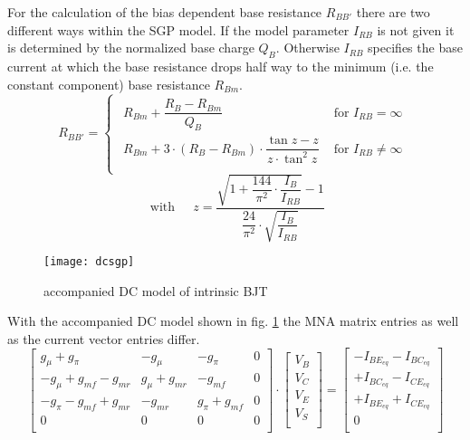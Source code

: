 For the calculation of the bias dependent base resistance $R_{BB'}$
there are two different ways within the SGP model.  If the model
parameter $I_{RB}$ is not given it is determined by the normalized
base charge $Q_B$.  Otherwise $I_{RB}$ specifies the base current at
which the base resistance drops half way to the minimum (i.e. the
constant component) base resistance $R_{Bm}$.
\begin{equation}
R_{BB'} =
\begin{cases}
\begin{array}{ll}
R_{Bm} + \dfrac{R_B - R_{Bm}}{Q_B} & \text{ for } I_{RB} = \infty\\
R_{Bm} + 3\cdot \left(R_B - R_{Bm}\right)\cdot \dfrac{\tan{z} - z}{z\cdot \tan^2{z}} & \text{ for } I_{RB} \neq \infty\\
\end{array}
\end{cases}
\end{equation}
\begin{equation}
\text{ with } \;\;\;\;
z = \frac{\sqrt{1 + \dfrac{144}{\pi^2}\cdot\dfrac{I_B}{I_{RB}}} -1}{\dfrac{24}{\pi^2}\cdot\sqrt{\dfrac{I_B}{I_{RB}}}}
\end{equation}

\begin{figure}[ht]
\begin{center}
\texttt{[image: dcsgp]}
\end{center}
\caption{accompanied DC model of intrinsic BJT}
\label{fig:dcsgp}
\end{figure}
\FloatBarrier

With the accompanied DC model shown in fig. \ref{fig:dcsgp} the MNA
matrix entries as well as the current vector entries differ.
\begin{equation}
\begin{bmatrix}
g_{\mu} + g_{\pi} & -g_{\mu} & -g_{\pi} & 0\\
-g_{\mu} + g_{mf} -g_{mr} & g_{\mu} +g_{mr} & -g_{mf} & 0\\
-g_{\pi} - g_{mf} +g_{mr} & -g_{mr} & g_{\pi} + g_{mf} & 0\\
0 & 0 & 0 & 0\\
\end{bmatrix}
\cdot
\begin{bmatrix}
V_{B}\\
V_{C}\\
V_{E}\\
V_{S}\\
\end{bmatrix}
=
\begin{bmatrix}
-I_{BE_{eq}} - I_{BC_{eq}}\\
+I_{BC_{eq}} - I_{CE_{eq}}\\
+I_{BE_{eq}} + I_{CE_{eq}}\\
0\\
\end{bmatrix}
\end{equation}

